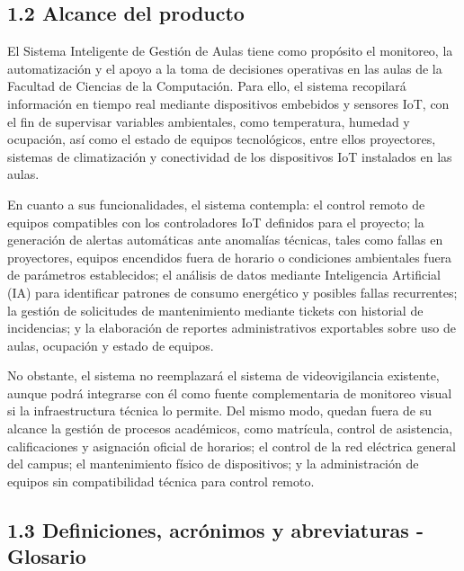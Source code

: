 \subsection*{1.2 Alcance del producto}


El Sistema Inteligente de Gestión de Aulas tiene como propósito el monitoreo, la automatización y el apoyo a la toma de decisiones operativas en las aulas de la Facultad de Ciencias de la Computación. Para ello, el sistema recopilará información en tiempo real mediante dispositivos embebidos y sensores IoT, con el fin de supervisar variables ambientales, como temperatura, humedad y ocupación, así como el estado de equipos tecnológicos, entre ellos proyectores, sistemas de climatización y conectividad de los dispositivos IoT instalados en las aulas.


En cuanto a sus funcionalidades, el sistema contempla: el control remoto de equipos compatibles con los controladores IoT definidos para el proyecto; la generación de alertas automáticas ante anomalías técnicas, tales como fallas en proyectores, equipos encendidos fuera de horario o condiciones ambientales fuera de parámetros establecidos; el análisis de datos mediante Inteligencia Artificial (IA) para identificar patrones de consumo energético y posibles fallas recurrentes; la gestión de solicitudes de mantenimiento mediante tickets con historial de incidencias; y la elaboración de reportes administrativos exportables sobre uso de aulas, ocupación y estado de equipos.


No obstante, el sistema no reemplazará el sistema de videovigilancia existente, aunque podrá integrarse con él como fuente complementaria de monitoreo visual si la infraestructura técnica lo permite. Del mismo modo, quedan fuera de su alcance la gestión de procesos académicos, como matrícula, control de asistencia, calificaciones y asignación oficial de horarios; el control de la red eléctrica general del campus; el mantenimiento físico de dispositivos; y la administración de equipos sin compatibilidad técnica para control remoto.


\subsection*{1.3 Definiciones, acrónimos y abreviaturas - Glosario}


